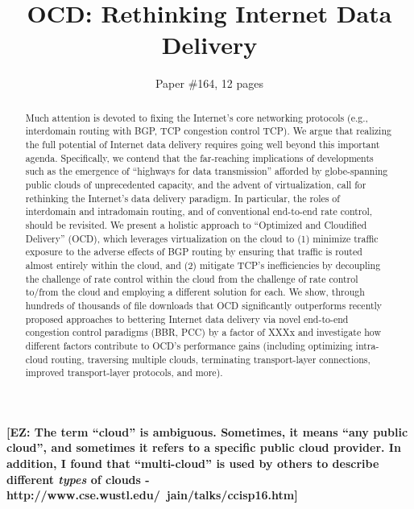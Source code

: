 \documentclass[10pt,sigconf]{acmart}
\title{OCD: Rethinking Internet Data Delivery}
\author{Paper \#164, 12 pages}
\newcommand{\mycomm}[3]{{\color{#2} \textbf{[#1: #3]}}}
\newcommand{\mycomm}[3]{}
\newcommand{\EZ}[1]{\mycomm{EZ}{teal}{#1}}
\begin{document}
\sloppypar
    
\begin{abstract}
Much attention is devoted to fixing the Internet's core networking protocols (e.g., interdomain routing with BGP, TCP congestion control TCP). We argue that realizing the full potential of Internet data delivery requires going well beyond this important agenda. Specifically, we contend that the far-reaching implications of developments such as the emergence of ``highways for data transmission'' afforded by globe-spanning public clouds of unprecedented capacity, and the advent of virtualization, call for rethinking the Internet's data delivery paradigm. In particular, the roles of interdomain and intradomain routing, and of conventional end-to-end rate control, should be revisited. We present a holistic approach to ``Optimized and Cloudified Delivery'' (OCD), which leverages virtualization on the cloud to (1) minimize traffic exposure to the adverse effects of BGP routing by ensuring that traffic is routed almost entirely within the cloud, and (2) mitigate TCP's inefficiencies by decoupling the challenge of rate control within the cloud from the challenge of rate control to/from the cloud and employing a different solution for each. We show, through hundreds of thousands of file downloads that OCD significantly outperforms recently proposed approaches to bettering Internet data delivery via novel end-to-end congestion control paradigms (BBR, PCC) by a factor of XXXx and investigate how different factors contribute to OCD's performance gains (including optimizing intra-cloud routing, traversing multiple clouds, terminating transport-layer connections, improved transport-layer protocols, and more).
\end{abstract}

\ifacmart

\maketitle
\else
\fi




\EZ{The term ``cloud'' is ambiguous. Sometimes, it means ``any public cloud'', and sometimes it refers to a specific public cloud provider. In addition, I found that ``multi-cloud'' is used by others to describe different \emph{types} of clouds - http://www.cse.wustl.edu/~jain/talks/ccisp16.htm}
\end{document}
